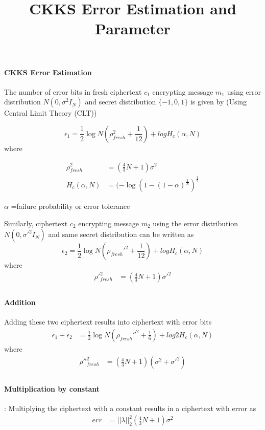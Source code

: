 \documentclass[a4paper,10pt]{article}
\title{CKKS Error Estimation and Parameter}
\author{}
\date{}
\begin{document}
\maketitle

\paragraph{CKKS Error Estimation}
The number of error bits in fresh ciphertext $c_1$ encrypting message $m_1$ using error distribution $N(0,\sigma^2 I_N)$ and secret distribution $\{-1,0,1\}$ is given by (Using Central Limit Theory (CLT))

\begin{equation}
 \epsilon_1 = \frac{1}{2}\log N(\rho_{fresh}^2+\frac{1}{12}) + log H_c (\alpha,N)
\end{equation}
where

\begin{align*}
    \rho^2_{fresh}&=(\frac{4}{3}N+1)\sigma^2 \\
    H_c (\alpha,N)&=(-\log (1-(1-\alpha)^\frac{2}{N})^\frac{1}{2}
\end{align*}

$\alpha$ =failure probability or error tolerance

Similarly, ciphertext $c_2$ encrypting message $m_2$ using the error distribution $N(0,\sigma'^2 I_N)$ and same secret distribution can be written as
\begin{equation}
 \epsilon_2 = \frac{1}{2}\log N(\rho_{fresh}'^2+\frac{1}{12}) + log H_c (\alpha,N)
\end{equation}
where
\begin{align*}
    \rho'^2_{fresh}&=(\frac{4}{3}N+1)\sigma'^2 \\
\end{align*}

\paragraph{Addition} Adding these two ciphertext results into ciphertext with error bits
\begin{align}
  \epsilon_1+\epsilon_2 &= \frac{1}{2}\log N(\rho_{fresh}''^2+\frac{1}{6}) + log 2H_c (\alpha,N)
\end{align}
where
\begin{align*}
    \rho''^2_{fresh}&=(\frac{4}{3}N+1)(\sigma^2+\sigma'^2) \\
\end{align*}

\paragraph{Multiplication by constant}: Multiplying the ciphertext with a constant results in a ciphertext with error as
\begin{align}
    err &= ||\lambda||^2_2(\frac{4}{3}N+1)\sigma^2
\end{align}
\end{document}
